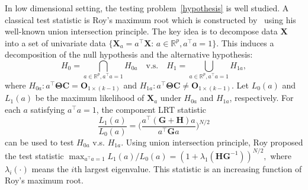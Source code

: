 \documentclass[12pt]{article} %
\newcommand{\bX}{\mathbf{X}}
\newcommand{\bH}{\mathbf{H}}
\newcommand{\bG}{\mathbf{G}}
\newcommand{\bC}{\mathbf{C}}
\newcommand{\bO}{\mathbf{O}}
\newcommand{\bfsym}[1]{\ensuremath{\boldsymbol{#1}}}
\def\bTheta {\bfsym {\Theta}}
\theoremstyle{definition}
\begin{document}
In low dimensional setting, the testing problem~\eqref{hypothesis} is well studied.
A classical test statistic is Roy's maximum root which is constructed by~\cite{Roy1953} using his well-known union intersection principle.
        The key idea is to decompose data $\bX$ into a set of univariate data $\{\bX_{a}=a^\top \bX:\, a\in \mathbb{R}^p, a^\top a=1\}$.
        This induces a decomposition of the null hypothesis and the alternative hypothesis:
        $$
        H_0=\bigcap_{a\in\mathbb{R}^p, a^\top a=1} H_{0a} \quad \text{v.s.} \quad 
        H_1=\bigcup_{a\in\mathbb{R}^p, a^\top a=1} H_{1a},
        $$
        where 
 $H_{0a}: a^\top \bTheta \bC = \bO_{1\times (k-1)}$ and  $H_{1a} : a^\top \bTheta \bC \neq \bO_{1\times (k-1)}$.
Let $L_0(a)$ and $L_1(a)$ be the maximum likelihood of $\bX_a$ under $H_{0a}$ and $H_{1a}$, respectively.
For each $a$ satisfying $a^\top a=1$, the component LRT statistic
$$ \frac{L_1(a)}{L_0(a)}=\Big(\frac{a^\top(\bG+\bH) a}{a^\top \bG a}\Big)^{N/2}$$
can be used to test $H_{0a}$ v.s. $H_{1a}$. 
Using union intersection principle, Roy proposed the test statistic
$
\max_{a^\top a=1}  {L_1(a)}/{L_0(a)}=(1+\lambda_{1}(\bH\bG^{-1}))^{N/2},
$
where $\lambda_{i}(\cdot)$ means the $i$th largest eigenvalue.
This statistic is an increasing function of Roy's maximum root.
\end{document}
